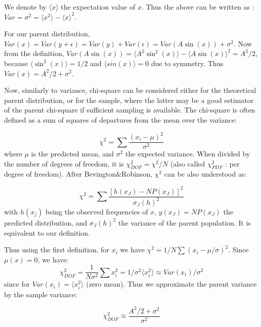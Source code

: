 \documentclass[fleqn,usenatbib]{mnras}  %
\begin{document}
We denote by $\langle x \rangle$ the expectation value of $x$. Thus the above can be written as : $Var= \sigma^{2} = \langle x^{2} \rangle - \langle x \rangle ^{2}$. 

For our parent distribution,  $Var(x) = Var(y+\epsilon) = Var(y) + Var(\epsilon) = Var(A \sin(x)) + \sigma^{2}$. Now from the definition, $Var(A\sin(x)) = \langle A^{2} \sin^{2}(x) \rangle - \langle A \sin(x) \rangle ^{2} = A^{2} / 2 $, because $\langle \sin^{2}(x) \rangle = 1/2$ and $\langle sin(x)\rangle = 0$ due to symmetry. Thus $Var(x) = A^{2}/2  + \sigma^{2}$. 

Now,  similarly to variance, chi-square can be considered either for the theoretical parent distribution, or for the sample, where the latter may be a good estimator of the parent chi-square if sufficient sampling is available. The chi-square is often defined as a sum of squares of departures from the mean over the variance: 

\begin{equation}
\chi^{2} = \sum\frac{(x_{i} - \mu)^{2}}{\sigma^{2}}
\end{equation}
where $\mu$ is the predicted mean, and $\sigma^{2}$ the expected variance. When divided by the number of degrees of freedom, it is  $\chi^{2}_{DOF} = \chi^{2} / N$ (also called $\chi^{2}_{PDF}$ : per degree of freedom). After Bevington$\&$Robinson, $\chi^{2}$ can be also understood as:

\begin{equation}
\chi^{2} = \sum \frac{[h(x_{J}) - N P(x_{J})]^{2}}{\sigma_{J}(h)^{2}}
\end{equation} 
with $h(x_{j})$ being the observed frequencies of $x$,  $y(x_{J}) = N P(x_{J})$ the predicted distribution, and $\sigma_{J}(h)^{2}$ the variance of the parent population. It is equivalent to our definition.

Thus using the first definition, for $x_{i}$ we have  $\chi^{2} = {1/N} \sum(x_{i} - \mu / \sigma)^{2}$. Since  $\mu(x) = 0$, we have:
\begin{equation}
\chi^{2}_{DOF} = \frac{1}{N\sigma^{2}} \sum x_{i}^{2} = 1/\sigma^{2} \langle x_{i}^{2} \rangle \approx  Var(x_{i}) / \sigma^{2}
\end{equation}
since for $Var(x_{i}) =  \langle x_{i}^{2} \rangle $ (zero mean). Thus we approximate the  parent variance by the sample variance: 

\begin{equation}
\chi^{2}_{DOF} \approx \frac{A^{2}/2 + \sigma^{2}}{\sigma^{2}}
\end{equation}
\end{document}
